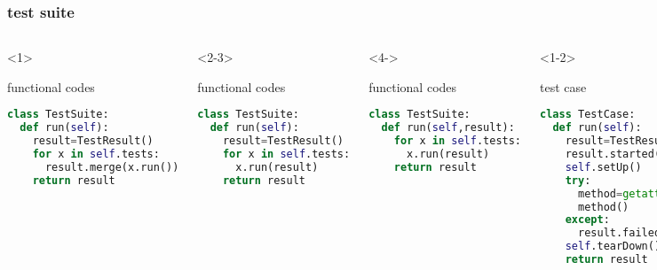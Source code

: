 \documentclass[lualatex]{beamer}
\begin{document}
\begin{frame}[fragile,t]
    \frametitle{test suite}

    \begin{columns}[t]
        \small
        \begin{onlyenv}<1>
            \begin{block}{functional codes}
                \begin{lstlisting}[language=Python,columns=fullflexible]
class TestSuite:
  def run(self):
    result=TestResult()
    for x in self.tests:
      result.merge(x.run())
    return result
                \end{lstlisting}
            \end{block}
        \end{onlyenv}

        \begin{onlyenv}<2-3>
            \begin{block}{functional codes}
                \begin{lstlisting}[language=Python,columns=fullflexible]
class TestSuite:
  def run(self):
    result=TestResult()
    for x in self.tests:
      x.run(result)
    return result
                \end{lstlisting}
            \end{block}
        \end{onlyenv}

        \begin{onlyenv}<4->
            \begin{block}{functional codes}
                \begin{lstlisting}[language=Python,columns=fullflexible]
class TestSuite:
  def run(self,result):
    for x in self.tests:
      x.run(result)
    return result
                \end{lstlisting}
            \end{block}
        \end{onlyenv}

        \begin{onlyenv}<1-2>
            \begin{block}{test case}
                \begin{lstlisting}[language=Python,columns=fullflexible]
class TestCase:
  def run(self):
    result=TestResult()
    result.started()
    self.setUp()
    try:
      method=getattr(self,self.name)
      method()
    except:
      result.failed()
    self.tearDown()
    return result
                \end{lstlisting}
            \end{block}
        \end{onlyenv}


\end{columns}
\end{frame}
\end{document}
